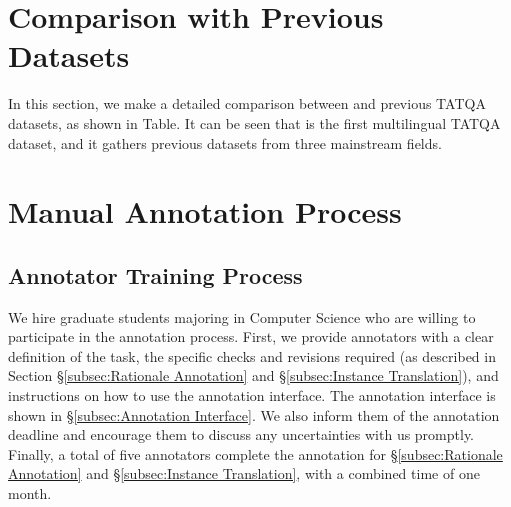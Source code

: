 \section{Comparison with Previous Datasets}
\label{sec:comparison}
In this section, we make a detailed comparison between \ourdataset and previous TATQA datasets, as shown in Table.
It can be seen that \ourdataset is the first multilingual TATQA dataset, and it gathers previous datasets from three mainstream fields.

\begin{table*}[ht]
    \centering
    \small
    
    \caption{
        Comparison of \ourdataset to previous TATQA datasets.
    }
    \label{tab:comparison_tat}
\end{table*}


\section{Manual Annotation Process}

\subsection{Annotator Training Process}
\label{subsec:Annotator Training Process}
We hire graduate students majoring in Computer Science who are willing to participate in the annotation process. 
First, we provide annotators with a clear definition of the task, the specific checks and revisions required (as described in Section \S\ref{subsec:Rationale Annotation} and \S\ref{subsec:Instance Translation}), and instructions on how to use the annotation interface. 
The annotation interface is shown in \S\ref{subsec:Annotation Interface}. 
We also inform them of the annotation deadline and encourage them to discuss any uncertainties with us promptly.
Finally, a total of five annotators complete the annotation for \S\ref{subsec:Rationale Annotation} and \S\ref{subsec:Instance Translation}, with a combined time of one month.

